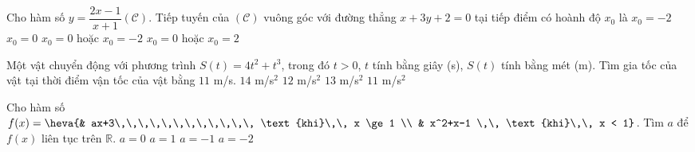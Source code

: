 \begin{ex}%
	Cho hàm số $y=\dfrac{2x-1}{x+1} (\mathcal{C})$. Tiếp tuyến của $(\mathcal{C})$ vuông góc với đường thẳng $x+3y+2=0$ tại tiếp điểm có hoành độ $x_0$ là
	\choice
	{$x_0=-2$}
	{ $x_0=0$}
	{\True $x_0=0$ hoặc $x_0=-2$}
	{$x_0=0$ hoặc $x_0=2$}
\end{ex}

\begin{ex}%
	Một vật chuyển động với phương trình $S(t)=4t^2+t^3$, trong đó $t>0$, $t$ tính bằng giây (s), $S(t)$ tính bằng mét (m). Tìm gia tốc của vật tại thời điểm vận tốc của vật bằng $11$ m/s.
	\choice
	{\True $14$ m/s$^2$}
	{$12$ m/s$^2$}
	{$13$ m/s$^2$}
	{$11$ m/s$^2$}
\end{ex}

\begin{ex}%
	Cho hàm số $f(x)=\heva{& ax+3\,\,\,\,\,\,\,\,\,\,\,\, \text{khi}\,\, x \ge 1 \\ & x^2+x-1 \,\, \text{khi}\,\, x < 1}$. Tìm $a$ để $f(x)$ liên tục trên $\mathbb{R}$.
	\choice
	{$a=0$}
	{$a=1$}
	{$a=-1$}
	{\True $a=-2$}
\end{ex}

